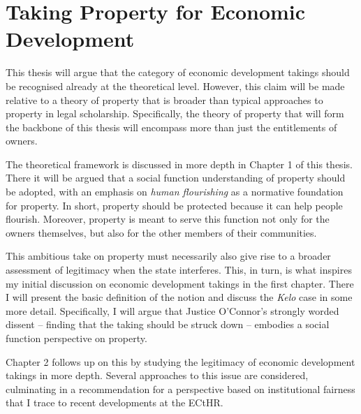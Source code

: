 \section{Taking Property for Economic Development}

This thesis will argue that the category of economic development takings should be recognised already at the theoretical level. However, this claim will be made relative to a theory of property that is broader than typical approaches to property in legal scholarship. Specifically, the theory of property that will form the backbone of this thesis will encompass more than just the entitlements of owners. 

The theoretical framework is discussed in more depth in Chapter 1 of this thesis. There it will be argued that a social function understanding of property should be adopted, with an emphasis on {\it human flourishing} as a normative foundation for property. In short, property should be protected because it can help people flourish. Moreover, property is meant to serve this function not only for the owners themselves, but also for the other members of their communities.

This ambitious take on property must necessarily also give rise to a broader assessment of legitimacy when the state interferes. This, in turn, is what inspires my initial discussion on economic development takings in the first chapter. There I will present the basic definition of the notion and discuss the {\it Kelo} case in some more detail. Specifically, I will argue that Justice O'Connor's strongly worded dissent -- finding that the taking should be struck down -- embodies a social function perspective on property.

Chapter 2 follows up on this by studying the legitimacy of economic development takings in more depth. Several approaches to this issue are considered, culminating in a recommendation for a perspective based on institutional fairness that I trace to recent developments at the ECtHR. 


